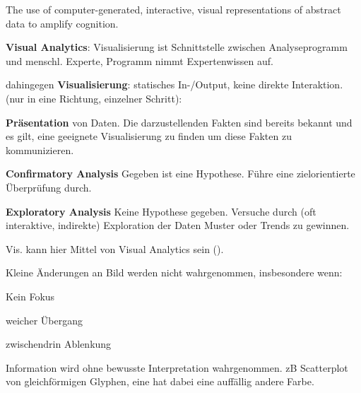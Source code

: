 \documentclass[10pt]{article} %
\begin{document}
\begin{definition}[Visualisation] 
       The use of computer-generated, interactive, visual representations of abstract data to amplify cognition.
\end{definition} 

\begin{definition} 
  \begin{cptitemize}
  \item \textbf{Visual Analytics}: Visualisierung ist Schnittstelle zwischen
    Analyseprogramm und menschl. Experte, Programm nimmt Expertenwissen auf.
  \item dahingegen \textbf{Visualisierung}: statisches In-/Output, keine
    direkte Interaktion.  (nur in eine Richtung, einzelner Schritt):
    \begin{cptitemize}
    \item \textbf{Präsentation} von Daten. Die darzustellenden Fakten sind
      bereits bekannt und es gilt, eine geeignete Visualisierung zu finden um
      diese Fakten zu kommunizieren.
    \item \textbf{Confirmatory Analysis} Gegeben ist eine Hypothese. Führe eine
      zielorientierte Überprüfung durch.
    \item \textbf{Exploratory Analysis} Keine Hypothese gegeben. Versuche durch
      (oft interaktive, indirekte) Exploration der Daten Muster oder Trends zu
      gewinnen.
    \end{cptitemize}
    Vis. kann hier Mittel von Visual Analytics sein ().
  \end{cptitemize} 
\end{definition}

\begin{definition}
  Kleine Änderungen an Bild werden nicht wahrgenommen, insbesondere wenn:
  \begin{cptitemize}
  \item Kein Fokus
  \item weicher Übergang
  \item zwischendrin Ablenkung
  \end{cptitemize}
\end{definition}

\begin{definition} 
  Information wird ohne bewusste Interpretation wahrgenommen. zB Scatterplot von
  gleichförmigen Glyphen, eine hat dabei eine auffällig andere Farbe.
\end{definition}
\end{document}
